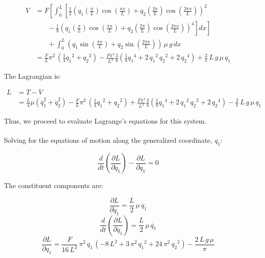\documentclass[12pt, letterpaper]{../assignment}
\begin{document}
\begin{equation*}
  \begin{aligned}
    V &= F \left[ \int_0^L \left[ \frac{1}{2}\left(q_1 \left(\frac{\pi}{L}\right) \cos\left(\frac{\pi x}{L}\right) + q_2 \left(\frac{2 \pi }{L}\right) \cos\left(\frac{2 \pi x}{L}\right)\right)^2 \right. \right. \\
    &\ \ \ \ \ \ \ \ - \left. \left. \frac{1}{8}\left(q_1 \left(\frac{\pi}{L}\right) \cos\left(\frac{\pi x}{L}\right) + q_2 \left(\frac{2 \pi }{L}\right) \cos\left(\frac{2 \pi x}{L}\right)\right)^4 \right] dx \right] \\
    &\ \ \ \ \ \ \ \ + \int_0^L \left( q_1 \sin\left(\frac{\pi x}{L}\right) + q_2 \sin\left(\frac{2 \pi x}{L}\right) \right)\,\mu\,g\, dx \\
    &= \frac{F}{L}\pi^2 \,{\left(\frac{1}{4}{q_1 }^2 +{q_2 }^2 \right)}
    -\frac{F\pi^4}{L^3}\frac{3}{8}{\left(\frac{1}{8}{q_1 }^4 +2\,{q_1 }^2 \,{q_2 }^2 +2\,{q_2 }^4 \right)}
    +\frac{2}{\pi}\,L\,g\,\mu \,q_1 
  \end{aligned}
\end{equation*}

The Lagrangian is:

\begin{equation*}
  \begin{aligned}
    L &= T - V \\
      &= \frac{L}{4}\mu \left( \dot{q}_1^2 + \dot{q}_2^2 \right)
      - \frac{F}{L}\pi^2 \,{\left(\frac{1}{4}{q_1 }^2 +{q_2 }^2 \right)}
      +\frac{F\pi^4}{L^3}\frac{3}{8}{\left(\frac{1}{8}{q_1 }^4 +2\,{q_1 }^2 \,{q_2 }^2 +2\,{q_2 }^4 \right)}
      -\frac{2}{\pi}\,L\,g\,\mu \,q_1 
  \end{aligned}
\end{equation*}

Thus, we proceed to evaluate Lagrange's equations for this system.
\\\\
Solving for the equations of motion along the generalized coordinate, $q_1$:

$$ \frac{d}{d t} \left( \frac{\partial L}{\partial \dot{q}_1}\right) - \frac{\partial L}{\partial q_1} = 0 $$

The constituent components are:

$$ \frac{\partial L}{\partial \dot{q}_1} = \frac{L}{2}\,\mu \,\dot{q_1}  $$
$$ \frac{d}{d t} \left( \frac{\partial L}{\partial \dot{q}_1}\right) = \frac{L}{2}\,\mu \,\ddot{q_1}  $$
$$ \frac{\partial L}{\partial {q}_1} = \frac{F}{16\,L^3 }\,\pi^2 \,q_1 \,{\left(-8\,L^2 +3\,\pi^2 \,{q_1 }^2 +24\,\pi^2 \,{q_2 }^2 \right)}-\frac{2\,L\,g\,\mu }{\pi } $$
\end{document}
